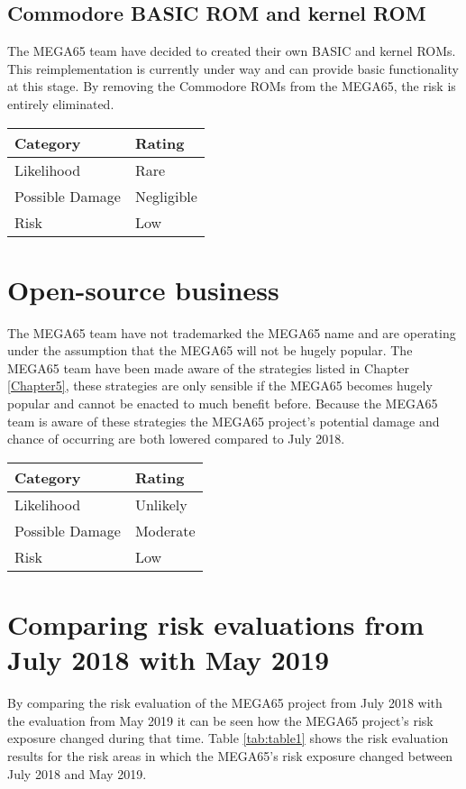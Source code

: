 \subsection{Commodore BASIC ROM and kernel ROM}
The MEGA65 team have decided to created their own BASIC and kernel ROMs. This reimplementation is currently under way and can provide basic functionality at this stage. By removing the Commodore ROMs from the MEGA65, the risk is entirely eliminated. \\

\begin{tabular}{l|l} %
    	\textbf{Category} 	&	\textbf{Rating} \\
      \hline
     Likelihood			&	Rare \\
     Possible Damage 	& 	Negligible \\
     Risk 				&	Low		\\	
    \end{tabular}


\section{Open-source business}
The MEGA65 team have not trademarked the MEGA65 name and are operating under the assumption that the MEGA65 will not be hugely popular. The MEGA65 team have been made aware of the strategies listed in Chapter \ref{Chapter5}, these strategies are only sensible if the MEGA65 becomes hugely popular and cannot be enacted to much benefit before. Because the MEGA65 team is aware of these strategies the MEGA65 project's potential damage and chance of occurring are both lowered compared to July 2018. 

\begin{tabular}{l|l} %
    	\textbf{Category} 	&	\textbf{Rating} \\
      \hline
     Likelihood			&	Unlikely \\
     Possible Damage 	& 	Moderate \\
     Risk 				&	Low		\\	
    \end{tabular}


\section{Comparing risk evaluations from July 2018 with May 2019}
\label{comparing risk evaluations}
By comparing the risk evaluation of the MEGA65 project from July 2018 with the evaluation from May 2019 it can be seen how the MEGA65 project's risk exposure changed during that time. Table \ref{tab:table1} shows the risk evaluation results for the risk areas in which the MEGA65's risk exposure changed between July 2018 and May 2019.

